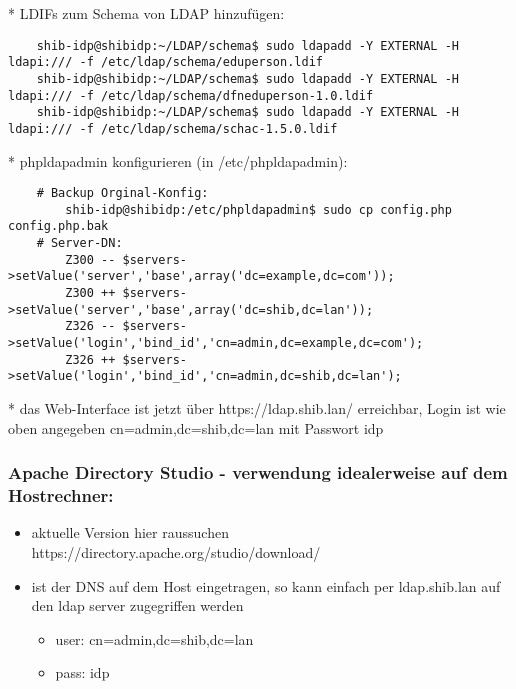 * LDIFs zum Schema von LDAP hinzufügen:
\begin{lstlisting}
	shib-idp@shibidp:~/LDAP/schema$ sudo ldapadd -Y EXTERNAL -H ldapi:/// -f /etc/ldap/schema/eduperson.ldif
	shib-idp@shibidp:~/LDAP/schema$ sudo ldapadd -Y EXTERNAL -H ldapi:/// -f /etc/ldap/schema/dfneduperson-1.0.ldif 
	shib-idp@shibidp:~/LDAP/schema$ sudo ldapadd -Y EXTERNAL -H ldapi:/// -f /etc/ldap/schema/schac-1.5.0.ldif 
\end{lstlisting}
* phpldapadmin konfigurieren (in /etc/phpldapadmin):
\begin{lstlisting}
	# Backup Orginal-Konfig:
		shib-idp@shibidp:/etc/phpldapadmin$ sudo cp config.php config.php.bak
	# Server-DN:
		Z300 -- $servers->setValue('server','base',array('dc=example,dc=com'));
		Z300 ++ $servers->setValue('server','base',array('dc=shib,dc=lan'));
		Z326 -- $servers->setValue('login','bind_id','cn=admin,dc=example,dc=com');
		Z326 ++ $servers->setValue('login','bind_id','cn=admin,dc=shib,dc=lan');
\end{lstlisting}
* das Web-Interface ist jetzt über https://ldap.shib.lan/ erreichbar, Login ist wie oben angegeben cn=admin,dc=shib,dc=lan mit Passwort idp

\subsubsection*{Apache Directory Studio - verwendung idealerweise auf dem
Hostrechner:}
\begin{itemize}
  \item aktuelle Version hier raussuchen
  https://directory.apache.org/studio/download/
  \item ist der DNS auf dem Host eingetragen, so kann einfach per ldap.shib.lan auf den ldap server zugegriffen werden
  \begin{itemize}
		\item user: cn=admin,dc=shib,dc=lan
		\item pass: idp
\end{itemize}
\end{itemize}
